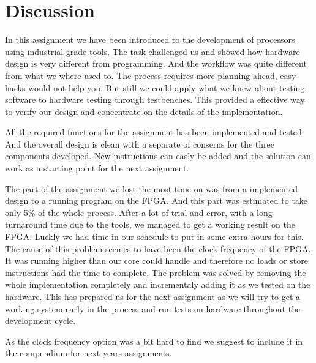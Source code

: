\section{Discussion}

In this assignment we have been introduced to the development of processors using 
industrial grade tools. The task challenged us and showed how hardware design is
very different from programming. And the workflow was quite different from what we
where used to. The process requires more planning ahead, easy hacks would not help you.
But still we could apply what we knew about testing software to hardware testing 
through testbenches. This provided a effective way to verify our design and concentrate
on the details of the implementation. 

All the required functions for the assignment has been implemented and tested. And the
overall design is clean with a separate of conserns for the three components developed. 
New instructions can easly be added and the solution can work as a starting point for the
next assignment. 

The part of the assignment we lost the most time on was from a implemented design to a running
program on the FPGA. And this part was estimated to take only 5\% of the whole process. 
After a lot of trial and error, with a long turnaround time due to the tools, we managed to get 
a working result on the FPGA. Luckly we had time in our schedule to put in some extra hours for this.
The cause of this problem seemes to have been the clock frequency of the FPGA. It was running higher 
than our core could handle and therefore no loads or store instructions had the time to complete. 
The problem was solved by removing the whole implementation completely and incrementaly adding
it as we tested on the hardware. This has prepared us for the next assignment as we will try
to get a working system early in the process and run tests on hardware throughout the development
cycle. 

As the clock frequency option was a bit hard to find we suggest to include it in the compendium
for next years assignments. 
